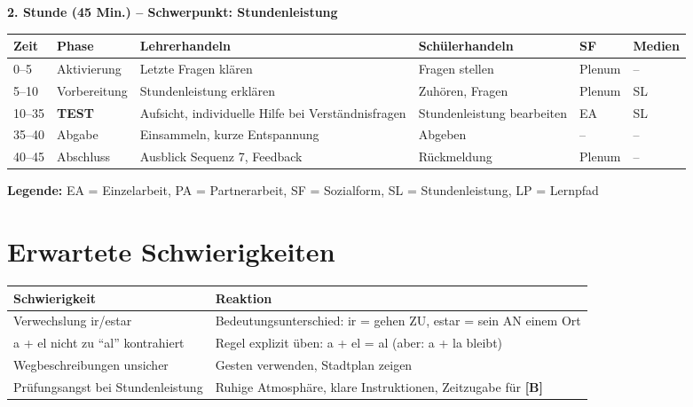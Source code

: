 \documentclass[11pt,a4paper]{article}
\newcommand{\B}{\textcolor{basis}{\textbf{[B]}}}
\begin{document}
\vspace{1em}

\textbf{2. Stunde (45 Min.) -- Schwerpunkt: Stundenleistung}

\begin{longtable}{|p{1cm}|p{1.5cm}|p{4cm}|p{3cm}|p{2cm}|p{2cm}|}
\hline
\textbf{Zeit} & \textbf{Phase} & \textbf{Lehrerhandeln} & \textbf{Schülerhandeln} & \textbf{SF} & \textbf{Medien} \\
\hline
\endhead

0--5 & Aktivierung & Letzte Fragen klären & Fragen stellen & Plenum & -- \\
\hline

5--10 & Vorbereitung & Stundenleistung erklären & Zuhören, Fragen & Plenum & SL \\
\hline

10--35 & \textbf{TEST} & Aufsicht, individuelle Hilfe bei Verständnisfragen & Stundenleistung bearbeiten & EA & SL \\
\hline

35--40 & Abgabe & Einsammeln, kurze Entspannung & Abgeben & -- & -- \\
\hline

40--45 & Abschluss & Ausblick Sequenz 7, Feedback & Rückmeldung & Plenum & -- \\
\hline
\end{longtable}

\textbf{Legende:} EA = Einzelarbeit, PA = Partnerarbeit, SF = Sozialform, SL = Stundenleistung, LP = Lernpfad

\section{Erwartete Schwierigkeiten}

\begin{tabular}{|p{5cm}|p{8cm}|}
\hline
\textbf{Schwierigkeit} & \textbf{Reaktion} \\
\hline
Verwechslung ir/estar & Bedeutungsunterschied: ir = gehen ZU, estar = sein AN einem Ort \\
\hline
a + el nicht zu ``al'' kontrahiert & Regel explizit üben: a + el = al (aber: a + la bleibt) \\
\hline
Wegbeschreibungen unsicher & Gesten verwenden, Stadtplan zeigen \\
\hline
Prüfungsangst bei Stundenleistung & Ruhige Atmosphäre, klare Instruktionen, Zeitzugabe für \B{} \\
\hline
\end{tabular}
\end{document}

